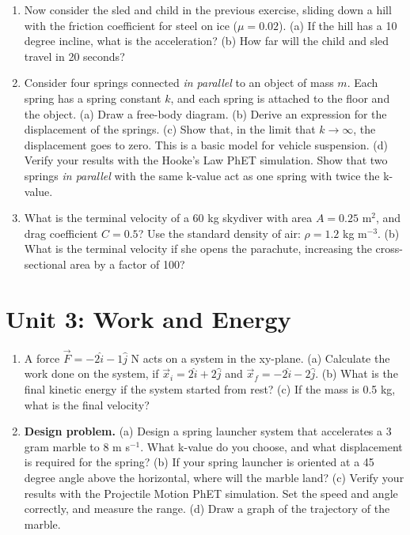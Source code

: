 \documentclass[10pt]{article}
\begin{document}
\begin{enumerate}
\item Now consider the sled and child in the previous exercise, sliding down a hill with the friction coefficient for steel on ice ($\mu=0.02$).  (a) If the hill has a 10 degree incline, what is the acceleration? (b) How far will the child and sled travel in 20 seconds? \\ \vspace{3cm}
\item Consider four springs connected \textit{in parallel} to an object of mass $m$.  Each spring has a spring constant $k$, and each spring is attached to the floor and the object. (a) Draw a free-body diagram. (b) Derive an expression for the displacement of the springs. (c) Show that, in the limit that $k \to \infty$, the displacement goes to zero.  This is a basic model for vehicle suspension. (d) Verify your results with the Hooke's Law PhET simulation.  Show that two springs \textit{in parallel} with the same k-value act as one spring with twice the k-value.  \\ \vspace{4cm}
\item What is the terminal velocity of a 60 kg skydiver with area $A = 0.25$ m$^2$, and drag coefficient $C = 0.5$?  Use the standard density of air: $\rho = 1.2$ kg m$^{-3}$. (b) What is the terminal velocity if she opens the parachute, increasing the cross-sectional area by a factor of 100? \\ \vspace{3cm}
\end{enumerate}

\section{Unit 3: Work and Energy}

\begin{enumerate}
\item A force $\vec{F} = -2\hat{i} - 1\hat{j}$ N acts on a system in the xy-plane.  (a) Calculate the work done on the system, if $\vec{x}_i = 2\hat{i} + 2\hat{j}$ and $\vec{x}_f = -2\hat{i} - 2\hat{j}$. (b) What is the final kinetic energy if the system started from rest?  (c) If the mass is 0.5 kg, what is the final velocity? \\ \vspace{4cm}
\item \textbf{Design problem.} (a) Design a spring launcher system that accelerates a 3 gram marble to 8 m s$^{-1}$.  What k-value do you choose, and what displacement is required for the spring? (b) If your spring launcher is oriented at a 45 degree angle above the horizontal, where will the marble land? (c) Verify your results with the Projectile Motion PhET simulation.  Set the speed and angle correctly, and measure the range. (d) Draw a graph of the trajectory of the marble.
\end{enumerate}
\end{document}

